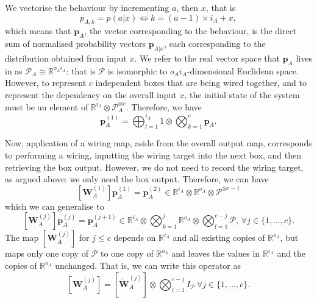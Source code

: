 \documentclass[10pt, a4paper]{article}
\numberwithin{equation}{section} %
\theoremstyle{definition}
\theoremstyle{plain}
\newcommand{\dintv}[2]{\mathopen\{#1,\ldots,#2\mathclose\}}
\newcommand{\?}{\mathrel{?}} %
\newcommand{\R}{\mathbb{R}} %
\newcommand{\cvec}[1]{\boldsymbol{\mathbf{#1}}}    %
\newcommand{\matrp}[2]{\left[\mathbf{#1}#2\right]} %
\newcommand{\sP}{\mathcal{P}}
\begin{document}
      We vectorise the behaviour by incrementing \(a\), then \(x\), that is
      \begin{equation}
        p_{A;k} = p(a|x) \Leftrightarrow k = (a-1) \times i_A + x,
      \end{equation}
      which means that \(\cvec{p}_A\), the vector corresponding to the behaviour, is the direct sum of normalised probability vectors \(\cvec{p}_{A|x}\), each corresponding to the distribution obtained from input \(x\). We refer to the real vector space that \(\cvec{p}_A\) lives in as \(\sP_A \cong \R^{o_Ai_A}\): that is \(\sP\) is isomorphic to \(o_Ai_A\)-dimensional Euclidean space. However, to represent \(c\) independent boxes that are being wired together, and to represent the dependency on the overall input \(x\), the initial state of the system must be an element of \(\R^{i_A} \otimes \sP_A^{\otimes c}\). Therefore, we have
      \begin{equation}
        \cvec{p}_A^{(1)} = \bigoplus_{l=1}^{i_A} 1 \otimes \bigotimes_{k=1}^c \cvec{p}_A.
      \end{equation}

      Now, application of a wiring map, aside from the overall output map, corresponds to performing a wiring, inputting the wiring target into the next box, and then retrieving the box output. However, we do not need to record the wiring target, as argued above: we only need the box output. Therefore, we can have
      \begin{equation}
        \matrp{W}{_A^{(1)}} \cvec{p}_A^{(1)} = \cvec{p}_A^{(2)} \in \R^{i_A} \otimes \R^{o_A} \otimes \sP^{\otimes c-1}
      \end{equation}
      which we can generalise to
      \begin{equation}
        \matrp{W}{_A^{(j)}} \cvec{p}_A^{(j)} = \cvec{p}_A^{(j+1)} \in \R^{i_A} \otimes \bigotimes_{k=1}^{j} \R^{o_A} \otimes \bigotimes_{l=1}^{c-j} \sP,\, \forall j \in \dintv{1}{c}.
      \end{equation}
      The map \(\matrp{W}{_A^{(j)}}\) for \(j \leq c\) depends on \(\R^{i_A}\) and all existing copies of \(\R^{o_A}\), but maps only one copy of \(\sP\) to one copy of \(\R^{o_A}\) and leaves the values in \(\R^{i_A}\) and the copies of \(\R^{o_A}\) unchanged. That is, we can write this operator as
      \begin{equation}
        \matrp{W}{_A^{(j)}} = \matrp{\tilde{W}}{_A^{(j)}} \otimes \bigotimes_{l=1}^{c-j} I_{\sP} \, \forall j \in \dintv{1}{c}.
      \end{equation}
\end{document}
